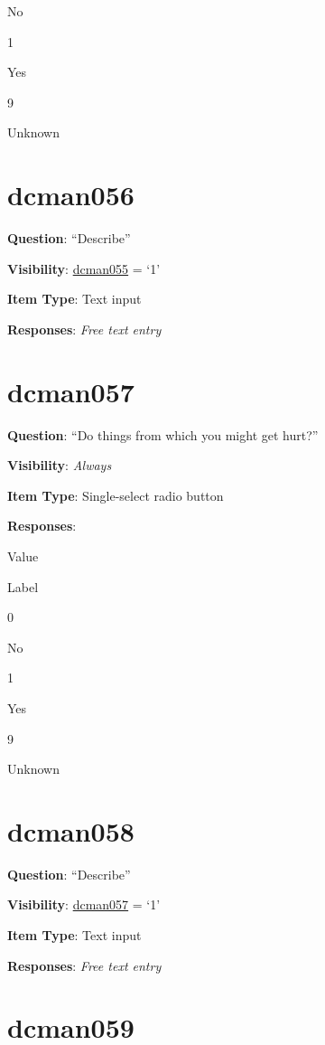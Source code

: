 \documentclass[]{book}
\begin{document}
No

1

Yes

9

Unknown

\hypertarget{dcman056}{%
\section{dcman056}\label{dcman056}}

\textbf{Question}: ``Describe''

\textbf{Visibility}: \protect\hyperlink{dcman055}{dcman055} = `1'

\textbf{Item Type}: Text input

\textbf{Responses}: \emph{Free text entry}

\hypertarget{dcman057}{%
\section{dcman057}\label{dcman057}}

\textbf{Question}: ``Do things from which you might get hurt?''

\textbf{Visibility}: \emph{Always}

\textbf{Item Type}: Single-select radio button

\textbf{Responses}:

Value

Label

0

No

1

Yes

9

Unknown

\hypertarget{dcman058}{%
\section{dcman058}\label{dcman058}}

\textbf{Question}: ``Describe''

\textbf{Visibility}: \protect\hyperlink{dcman057}{dcman057} = `1'

\textbf{Item Type}: Text input

\textbf{Responses}: \emph{Free text entry}

\hypertarget{dcman059}{%
\section{dcman059}\label{dcman059}}
\end{document}
